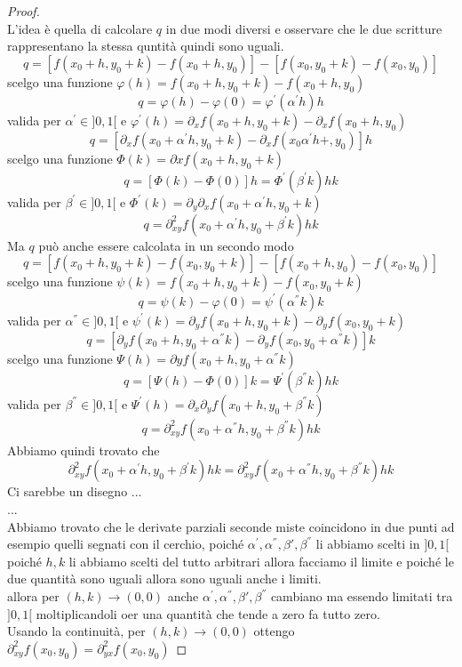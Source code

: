 \begin{proof}
\begin{tikzpicture}
	\end{tikzpicture}\\
	L'idea è quella di calcolare $q$ in due modi diversi e osservare che le due scritture rappresentano la stessa quntità quindi sono uguali.\\
	$$q=[f(x_0+h,y_0+k)-f(x_0+h,y_0)]-[f(x_0,y_0+k)-f(x_0,y_0)]$$
	scelgo una funzione $\varphi(h)=f(x_0+h,y_0+k)-f(x_0+h,y_0)$
	$$q=\varphi(h)-\varphi(0) = \varphi^{'}(\alpha^{'} h)h$$
	valida per $\alpha^{'}\in ]0,1[$ e $\varphi^{'}(h)=\partial_{x}f(x_0+h,y_0+k)-\partial_{x}f(x_0+h,y_0)$
	$$q = [\partial_{x}f(x_0+\alpha^{'}h,y_0+k)-\partial_{x}f(x_0\alpha^{'}h+,y_0)]h$$
	scelgo una funzione $\varPhi(k)=\partial{x}f(x_0+h,y_0+k)$
	$$q=[\varPhi(k)-\varPhi(0)]h=\varPhi^{'}(\beta^{'}k)hk$$
	valida per $\beta^{'}\in ]0,1[$ e $\varPhi^{'}(k)=\partial_{y}\partial_{x}f(x_0+\alpha^{'}h,y_0+k)$
	$$q = \partial^2_{xy}f(x_0+\alpha^{'}h,y_0+\beta^{'}k)hk$$
	Ma $q$ può anche essere calcolata in un secondo modo
	$$q=[f(x_0+h,y_0+k)-f(x_0,y_0+k)]-[f(x_0+h,y_0)-f(x_0,y_0)]$$
	scelgo una funzione $\psi(k)=f(x_0+h,y_0+k)-f(x_0,y_0+k)$
	$$q=\psi(k)-\varphi(0) = \psi^{'}(\alpha^{''}k)k$$
	valida per $\alpha^{''}\in ]0,1[$ e $\psi^{'}(k)=\partial_{y}f(x_0+h,y_0+k)-\partial_{y}f(x_0,y_0+k)$
	$$q = [\partial_{y}f(x_0+h,y_0+\alpha^{''}k)-\partial_{y}f(x_0,y_0+\alpha^{''}k)]k$$
	scelgo una funzione $\Psi(h)=\partial{y}f(x_0+h,y_0+\alpha^{''}k)$
	$$q=[\Psi(h)-\varPhi(0)]k=\Psi^{'}(\beta^{''}k)hk$$
	valida per $\beta^{''}\in ]0,1[$ e $\Psi^{'}(h)=\partial_{x}\partial_{y}f(x_0+h,y_0+\beta^{''}k)$
	$$q = \partial^2_{xy}f(x_0+\alpha^{''}h,y_0+\beta^{''}k)hk$$
	Abbiamo quindi trovato che 
	$$ \partial^2_{xy}f(x_0+\alpha^{'}h,y_0+\beta^{'}k)hk = \partial^2_{xy}f(x_0+\alpha^{''}h,y_0+\beta^{''}k)hk$$
	Ci sarebbe un disegno ...\\
	...\\
	Abbiamo trovato che le derivate parziali seconde miste coincidono in due punti ad esempio quelli segnati con il cerchio, poiché $\alpha^{'},\alpha^{''},\beta{'},\beta^{''}$ li abbiamo scelti in $]0,1[$\\
	poiché $h,k$ li abbiamo scelti del tutto arbitrari allora facciamo il limite e poiché le due quantità sono uguali allora sono uguali anche i limiti.\\
	allora per $(h,k)\rightarrow (0,0)$ anche $\alpha^{'},\alpha^{''},\beta{'},\beta^{''}$ cambiano ma essendo limitati tra $]0,1[$ moltiplicandoli oer una quantità che tende a zero fa tutto zero.\\
	Usando la continuità, per $(h,k)\rightarrow (0,0)$ ottengo $\partial^2_{xy}f(x_0,y_0)=\partial^2_{yx}f(x_0,y_0)$
\end{proof}
